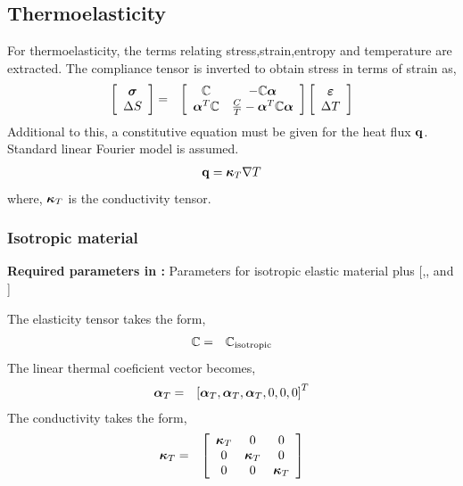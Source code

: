 \subsection{Thermoelasticity }
For thermoelasticity, the terms relating stress,strain,entropy and temperature are
extracted. The compliance tensor is inverted to obtain stress in
terms of strain as,
\begin{eqnarray}
\left[
\begin{array}{c}
\boldsymbol{\sigma} \\
\Delta S 
\end{array}
\right]
&=&
\left[
\begin{array}{cc}
\mathbb{C} & -\mathbb{C}\boldsymbol{\alpha} \\
\boldsymbol{\alpha}^T\mathbb{C} & \frac{C}{T}-\boldsymbol{\alpha}^T\mathbb{C}\boldsymbol{\alpha}
\end{array}
\right]
\left[
\begin{array}{c}
\boldsymbol{\varepsilon} \\
\Delta T
\end{array}
\right]
\end{eqnarray}
Additional to this, a constitutive equation must be given
for the heat flux $\mathbf{q}$. Standard linear Fourier model is assumed.
\begin{eqnarray}
\mathbf{q} = \boldsymbol{\kappa}_T\mathbf{\nabla} T
\end{eqnarray}
where, $\boldsymbol{\kappa}_T$ is the conductivity tensor.

\subsubsection{Isotropic material}
\begin{flushleft}
  \textbf{Required parameters in :}
  Parameters for isotropic elastic material plus [,, and ]
\end{flushleft}
The elasticity tensor takes the form,
\begin{eqnarray}
\mathbb{C} &=& \mathbb{C}_\text{isotropic}
\end{eqnarray}
The linear thermal coeficient vector becomes,
\begin{eqnarray}
\boldsymbol{\alpha}_T &=& \left[\boldsymbol{\alpha}_T,\boldsymbol{\alpha}_T,\boldsymbol{\alpha}_T,0,0,0  \right]^T
\end{eqnarray}
The conductivity takes the form,
\begin{eqnarray}
\boldsymbol{\kappa}_T &=&
\left[
\begin{array}{ccc}
\boldsymbol{\kappa}_T & 0 & 0 \\
0 & \boldsymbol{\kappa}_T & 0 \\
0 & 0 & \boldsymbol{\kappa}_T
\end{array}
\right]
\end{eqnarray}

